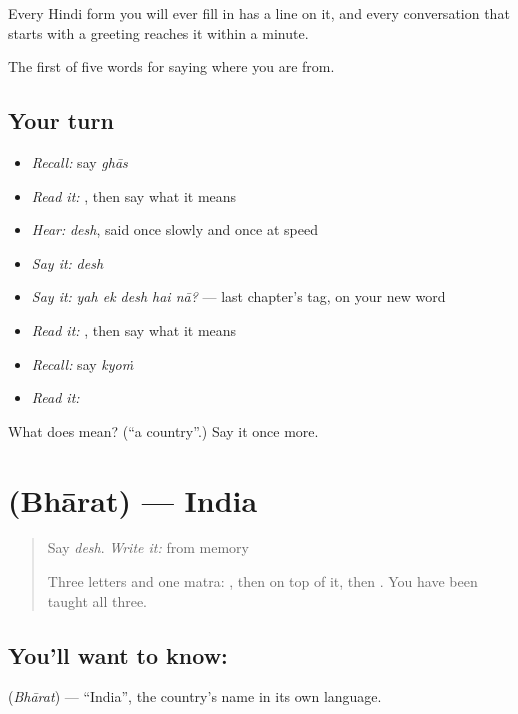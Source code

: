 Every Hindi form you will ever fill in has a  line on it, and every conversation that starts with a greeting reaches it within a minute.

\begin{grammarlens}[title={What you've built}]
The first of five words for saying where you are from.
\end{grammarlens}

\subsection*{Your turn}
\begin{itemize}
\raggedright
  \item \emph{Recall:} say \emph{ghās}
  \item \emph{Read it:} \textbf{}, then say what it means
  \item \emph{Hear:} \emph{desh}, said once slowly and once at speed
  \item \emph{Say it:} \emph{desh}
  \item \emph{Say it:} \emph{yah ek desh hai nā?} — last chapter's tag, on your new word
  \item \emph{Read it:} , then say what it means
  \item \emph{Recall:} say \emph{kyoṁ}
  \item \emph{Read it:} \textbf{}
\end{itemize}

\begin{tcolorbox}[breakable,colback=teal!4,colframe=teal!35!black,title={Before you move on}]
What does  mean? (\textquotedblleft{}a country\textquotedblright{}.) Say it once more.
\end{tcolorbox}
\section[\texorpdfstring{\hi{भारत} (Bhārat)}{भारत (Bhārat)}]{ (Bhārat) — India}

\label{lesson:HI-C68-india}



\begin{quote}
Say \emph{desh}. \emph{Write it:} \textbf{} from memory

Three letters and one matra: , then  on top of it, then . You have been taught all three.
\end{quote}

\subsection*{You'll want to know: }
\textbf{} (\emph{Bhārat}) — \textquotedblleft{}India\textquotedblright{}, the country's name in its own language.

